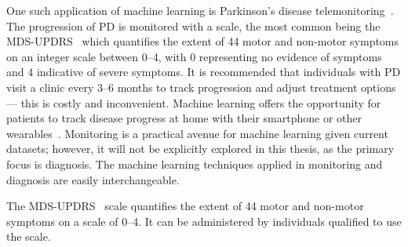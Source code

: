 \documentclass[12pt, twoside]{book}
\begin{document}









 

One such application of machine learning is Parkinson's disease telemonitoring~\cite{splittledysphonia2009, sptsanastelemonitor2010}. The progression of PD is monitored with a scale, the most common being the MDS-UPDRS~\cite{updrs} which quantifies the extent of 44 motor and non-motor symptoms on an integer scale between 0--4, with 0 representing no evidence of symptoms and 4 indicative of severe symptoms. It is recommended that individuals with PD visit a clinic every 3--6 months to track progression and adjust treatment options --- this is costly and inconvenient. Machine learning offers the opportunity for patients to track disease progress at home with their smartphone or other wearables~\cite{cancela2016monitoring}. Monitoring is a practical avenue for machine learning given current datasets; however, it will not be explicitly explored in this thesis, as the primary focus is diagnosis. The machine learning techniques applied in monitoring and diagnosis are easily interchangeable.

\begin{highlight}[UPDRS]
The MDS-UPDRS~\cite{updrs} scale quantifies the extent of 44 motor and non-motor symptoms on a scale of 0--4. It can be administered by individuals qualified to use the scale.
\end{highlight}
\end{document}
